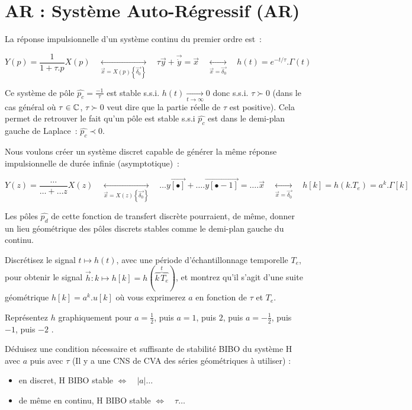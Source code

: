 \section{AR : Système Auto-Régressif (AR)} 

La réponse impulsionnelle d'un système continu du premier ordre est~:

$$ Y(p) = \frac{1}{1+\tau. p} X(p) \quad \underset{\vec{x}=X(p)\left\{\vec{\delta_0}\right\}}{\longleftrightarrow} \quad \tau \vec{y} + \vec{\dot{y}} = \vec{x}\quad \underset{\vec{x}=\vec{\delta_0}}{\longleftrightarrow} \quad h(t) = e^{-t/\tau}.\Gamma(t)$$

Ce système de pôle $\widehat{p_c}=\frac{-1}{\tau}$ est stable s.s.i.
$h(t) \underset{t\to \infty}{\rightarrow} 0$ donc s.s.i. $\tau\succ 0$
(dans le cas général où $\tau \in \mathbb{C}$, $\tau\succ 0$ veut dire que la
partie réelle de $\tau$ est positive). Cela permet de retrouver le
fait qu'un pôle est stable s.s.i $\widehat{p_c}$ est dans le demi-plan gauche de
Laplace~: $\widehat{p_c}\prec 0$.


Nous voulons créer un système discret capable de
générer la même réponse impulsionnelle de durée infinie (asymptotique)~:

$$Y(z) = \frac{\dots}{\dots +\dots z} X(z) \quad \underset{\vec{x}=X(z)\left\{\vec{\delta_0}\right\}}{\longleftrightarrow} \quad  \dots \vec{y[\bullet]} + \dots. \vec{y[\bullet-1]} = \dots . \vec{x}\quad \underset{\vec{x}=\vec{\delta_0}}{\longleftrightarrow} \quad h[k] = h\left(k.T_e\right) = a^k.\Gamma[k]$$

Les pôles $\widehat{p_d}$ de cette fonction de transfert discrète pourraient, de même, donner un lieu géométrique des pôles discrets stables comme le demi-plan gauche du continu.

 Discrétisez le signal $t\mapsto h(t)$, avec une période
d'échantillonnage temporelle $T_e$, pour obtenir le signal
$\vec{h} : k \mapsto h[k]=h(\overbrace{k\,T_e}^{t})$, et montrez qu'il
s'agit d'une suite géométrique $h[k]=a^k.u[k]$ où vous exprimerez $a$
en fonction de $\tau$ et $T_e$.

Représentez $h$ graphiquement pour $a=\frac{1}{2}$, puis $a=1$, puis
$2$, puis $a=-\frac{1}{2}$, puis $-1$, puis $-2$ .

Déduisez une condition nécessaire et suffisante de stabilité BIBO du système H avec $a$ puis avec $\tau$ (Il y a une CNS de CVA des séries géométriques à utiliser) : 
\begin{itemize}
\item en discret, H BIBO stable $\iff \quad |a| \ldots $
\item de même en continu, H BIBO stable $\iff \quad \tau \ldots$  
\end{itemize}

